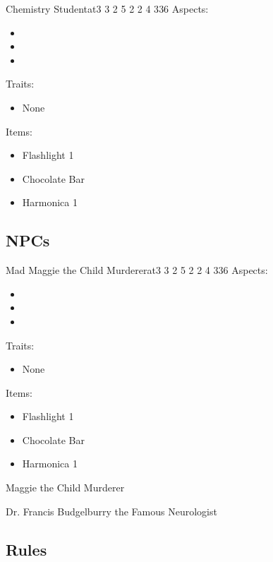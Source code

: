 \documentclass[11pt]{article}
\begin{document}
{\begin{npc}{Chemistry Student}{at}{3 3 2 5 2 2 4 3}{36}
Aspects:
\begin{itemize}
\item {}
\item {}
\item {}
\end{itemize}
\columnbreak

Traits:
\begin{itemize}
\item None
\end{itemize}

Items:
\begin{itemize}
\item Flashlight 1
\item Chocolate Bar
\item Harmonica 1
\end{itemize}
\end{npc}
\subsection{NPCs}
\label{sec:org652de5e}


\begin{npc}{Mad Maggie the Child Murderer}{at}{3 3 2 5 2 2 4 3}{36}
Aspects:
\begin{itemize}
\item {}
\item {}
\item {}
\end{itemize}
\columnbreak

Traits:
\begin{itemize}
\item None
\end{itemize}

Items:
\begin{itemize}
\item Flashlight 1
\item Chocolate Bar
\item Harmonica 1
\end{itemize}
\end{npc}

Maggie the Child Murderer

Dr. Francis Budgelburry the Famous Neurologist
\subsection{Rules}
\label{sec:org6d96629}

}
\end{document}
